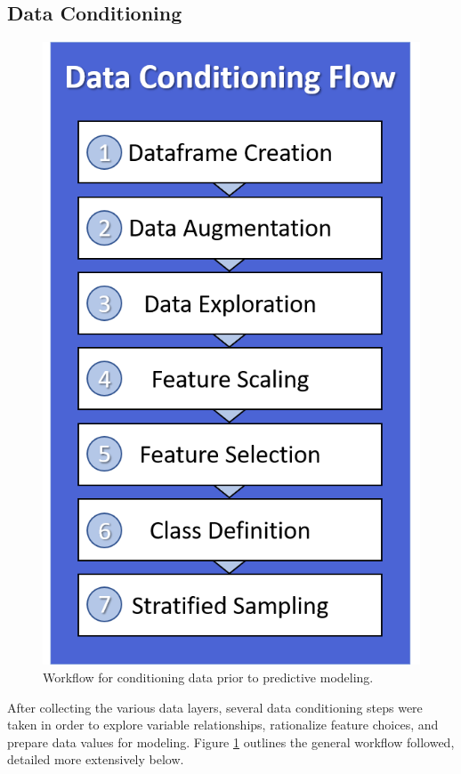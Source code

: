\subsection{Data Conditioning}\label{ch3:conditioning}
\begin{figure}
\centering
\includegraphics[width=0.89\linewidth]{templates/images/Flow-DataConditioning.png}
\singlespacing
\caption[Data conditioning workflow]{Workflow for conditioning data prior to predictive modeling.}
\label{fig:DC_Flow}
\end{figure}
After collecting the various data layers, several data conditioning steps were taken in order to explore variable relationships, rationalize feature choices, and prepare data values for modeling. Figure \ref{fig:DC_Flow} outlines the general workflow followed, detailed more extensively below.

